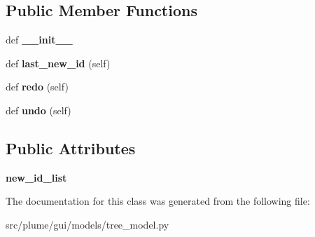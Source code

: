 \subsection*{Public Member Functions}
\begin{DoxyCompactItemize}
\item 
def {\bfseries \+\_\+\+\_\+init\+\_\+\+\_\+}\hypertarget{classplume-creator_1_1src_1_1plume_1_1gui_1_1models_1_1tree__model_1_1_add_after_node_command_ad7d805edfae8f5181f4ec8e01d90593a}{}\label{classplume-creator_1_1src_1_1plume_1_1gui_1_1models_1_1tree__model_1_1_add_after_node_command_ad7d805edfae8f5181f4ec8e01d90593a}

\item 
def {\bfseries last\+\_\+new\+\_\+id} (self)\hypertarget{classplume-creator_1_1src_1_1plume_1_1gui_1_1models_1_1tree__model_1_1_add_after_node_command_aed22097d17902df61af1c0b54fafab06}{}\label{classplume-creator_1_1src_1_1plume_1_1gui_1_1models_1_1tree__model_1_1_add_after_node_command_aed22097d17902df61af1c0b54fafab06}

\item 
def {\bfseries redo} (self)\hypertarget{classplume-creator_1_1src_1_1plume_1_1gui_1_1models_1_1tree__model_1_1_add_after_node_command_a23c8e9bf207597a6a902fc110b49d26e}{}\label{classplume-creator_1_1src_1_1plume_1_1gui_1_1models_1_1tree__model_1_1_add_after_node_command_a23c8e9bf207597a6a902fc110b49d26e}

\item 
def {\bfseries undo} (self)\hypertarget{classplume-creator_1_1src_1_1plume_1_1gui_1_1models_1_1tree__model_1_1_add_after_node_command_a8929c8f218a3bc5412208509cdb4c4ec}{}\label{classplume-creator_1_1src_1_1plume_1_1gui_1_1models_1_1tree__model_1_1_add_after_node_command_a8929c8f218a3bc5412208509cdb4c4ec}

\end{DoxyCompactItemize}
\subsection*{Public Attributes}
\begin{DoxyCompactItemize}
\item 
{\bfseries new\+\_\+id\+\_\+list}\hypertarget{classplume-creator_1_1src_1_1plume_1_1gui_1_1models_1_1tree__model_1_1_add_after_node_command_af740f8bd6c1acd8c218c8525d7f7734a}{}\label{classplume-creator_1_1src_1_1plume_1_1gui_1_1models_1_1tree__model_1_1_add_after_node_command_af740f8bd6c1acd8c218c8525d7f7734a}

\end{DoxyCompactItemize}


The documentation for this class was generated from the following file\+:\begin{DoxyCompactItemize}
\item 
src/plume/gui/models/tree\+\_\+model.\+py\end{DoxyCompactItemize}
